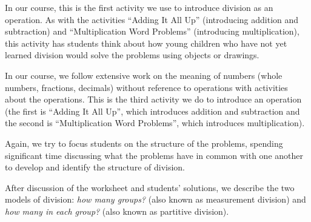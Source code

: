 \documentclass{ximera}
\begin{document}
\newpage

\begin{instructorNotes}
In our course, this is the first activity we use to introduce division as an operation.  As with the activities ``Adding It All Up'' (introducing addition and subtraction) and ``Multiplication Word Problems'' (introducing multiplication), this activity has students think about how young children who have not yet learned division would solve the problems using objects or drawings.

In our course, we follow extensive work on the meaning of numbers (whole numbers, fractions, decimals) without reference to operations with activities about the operations.  This is the third activity we do to introduce an operation (the first is ``Adding It All Up'', which introduces addition and subtraction and the second is ``Multiplication Word Problems'', which introduces multiplication). 

Again, we try to focus students on the structure of the problems, spending significant time discussing what the problems have in common with one another to develop and identify the structure of division.

After discussion of the worksheet and students' solutions, we describe the two models of division: {\em how many groups?} (also known as measurement division) and {\em how many in each group? } (also known as partitive division).


\end{instructorNotes}
\end{document}

